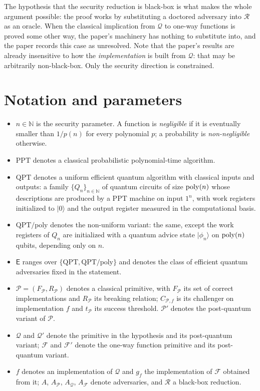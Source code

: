 \documentclass{aicr-conjecture}
\newcommand{\Pc}{\mathcal{P}}
\newcommand{\Qc}{\mathcal{Q}}
\newcommand{\Fc}{\mathcal{F}}
\newcommand{\Rc}{\mathcal{R}}
\newcommand{\Es}{\mathsf{E}}
\newcommand{\PPT}{\mathrm{PPT}}
\newcommand{\QPT}{\mathrm{QPT}}
\newcommand{\QPTpoly}{\mathrm{QPT}/\mathrm{poly}}
\newcommand{\ket}[1]{|#1\rangle}
\begin{document}
The hypothesis that the security reduction is black-box is what makes the
whole argument possible: the proof works by substituting a doctored
adversary into $\Rc$ as an oracle. When the classical implication from
$\Qc$ to one-way functions is proved some other way, the paper's
machinery has nothing to substitute into, and the paper records this case
as unresolved. Note that the paper's results are already insensitive to
how the \emph{implementation} is built from $\Qc$: that may be
arbitrarily non-black-box. Only the security direction is constrained.

\section{Notation and parameters}\label{sec:notation}

\begin{itemize}
\item $n \in \mathbb{N}$ is the security parameter. A function is
  \emph{negligible} if it is eventually smaller than $1/p(n)$ for every
  polynomial $p$; a probability is \emph{non-negligible} otherwise.
\item $\PPT$ denotes a classical probabilistic polynomial-time
  algorithm.
\item $\QPT$ denotes a uniform efficient quantum algorithm with
  classical inputs and outputs: a family $\{Q_n\}_{n \in \mathbb{N}}$ of
  quantum circuits of size $\mathrm{poly}(n)$ whose descriptions are produced by
  a $\PPT$ machine on input $1^n$, with work registers initialized to
  $\ket{0}$ and the output register measured in the computational basis.
\item $\QPTpoly$ denotes the non-uniform variant: the same, except the
  work registers of $Q_n$ are initialized with a quantum advice state
  $\ket{\phi_n}$ on $\mathrm{poly}(n)$ qubits, depending only on $n$.
\item $\Es$ ranges over $\{\QPT, \QPTpoly\}$ and denotes the class of
  efficient quantum adversaries fixed in the statement.
\item $\Pc = (F_{\Pc}, R_{\Pc})$ denotes a classical primitive, with
  $F_{\Pc}$ its set of correct implementations and $R_{\Pc}$ its
  breaking relation; $C_{\Pc,f}$ is its challenger on implementation $f$
  and $t_{\Pc}$ its success threshold. $\Pc'$ denotes the post-quantum
  variant of $\Pc$.
\item $\Qc$ and $\Qc'$ denote the primitive in the hypothesis and its
  post-quantum variant; $\Fc$ and $\Fc'$ denote the one-way function
  primitive and its post-quantum variant.
\item $f$ denotes an implementation of $\Qc$ and $g_f$ the implementation
  of $\Fc$ obtained from it; $A$, $A_{\Pc}$, $A_{\Qc}$, $A_{\Fc}$ denote
  adversaries, and $\Rc$ a black-box reduction.
\end{itemize}
\end{document}
